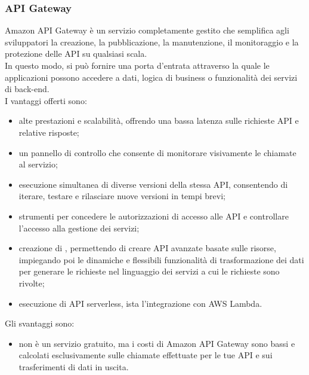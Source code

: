 \subsubsection{API Gateway}
Amazon API Gateway è un servizio completamente gestito che semplifica agli sviluppatori la creazione, la pubblicazione, la manutenzione, il monitoraggio e la protezione delle API su qualsiasi scala.\\
In questo modo, si può fornire una porta d'entrata attraverso la quale le applicazioni possono accedere a dati, logica di business o funzionalità dei servizi di back-end.\\
I vantaggi offerti sono:
\begin{itemize}
	\item alte prestazioni e scalabilità, offrendo una bassa latenza sulle richieste API e relative risposte;
	\item un pannello di controllo che consente di monitorare visivamente le chiamate al servizio;
	\item esecuzione simultanea di diverse versioni della stessa API, consentendo di iterare, testare e rilasciare nuove versioni in tempi brevi;
	\item strumenti per concedere le autorizzazioni di accesso alle API e controllare l'accesso alla gestione dei servizi;
	\item creazione di  , permettendo di creare API avanzate basate sulle risorse, impiegando poi le dinamiche e flessibili funzionalità di trasformazione dei dati per generare le richieste nel linguaggio dei servizi a cui le richieste sono rivolte;
	\item esecuzione di API serverless, ista l'integrazione con AWS Lambda.
\end{itemize}
Gli svantaggi sono:
\begin{itemize}
	\item non è un servizio gratuito, ma i costi di Amazon API Gateway sono bassi e calcolati esclusivamente sulle chiamate effettuate per le tue API e sui trasferimenti di dati in uscita.
\end{itemize}
\newpage
